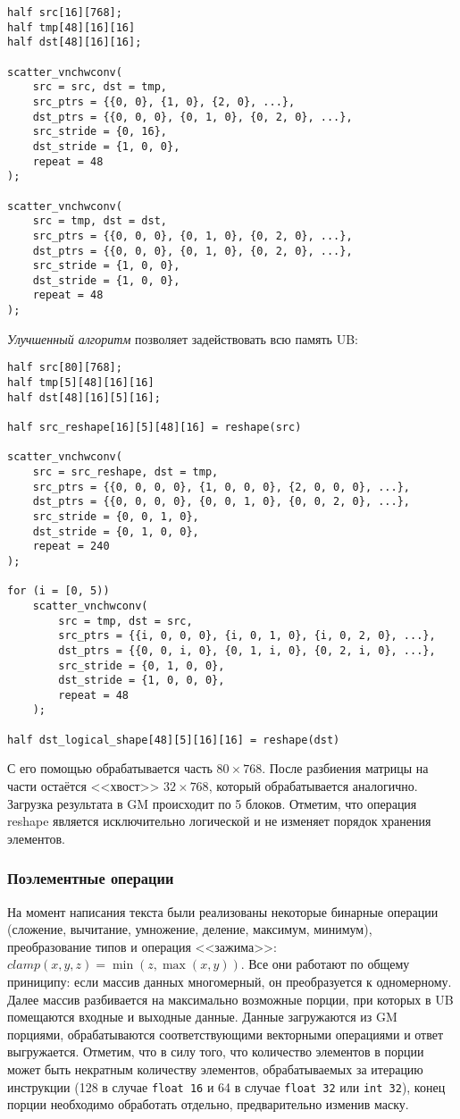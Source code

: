 \begin{lstlisting}
half src[16][768];
half tmp[48][16][16]
half dst[48][16][16];

scatter_vnchwconv(
    src = src, dst = tmp,
    src_ptrs = {{0, 0}, {1, 0}, {2, 0}, ...},
    dst_ptrs = {{0, 0, 0}, {0, 1, 0}, {0, 2, 0}, ...},
    src_stride = {0, 16},
    dst_stride = {1, 0, 0},
    repeat = 48
);

scatter_vnchwconv(
    src = tmp, dst = dst,
    src_ptrs = {{0, 0, 0}, {0, 1, 0}, {0, 2, 0}, ...},
    dst_ptrs = {{0, 0, 0}, {0, 1, 0}, {0, 2, 0}, ...},
    src_stride = {1, 0, 0},
    dst_stride = {1, 0, 0},
    repeat = 48
);
\end{lstlisting}

\textit{Улучшенный алгоритм} позволяет задействовать всю память UB:

\begin{lstlisting}
half src[80][768];
half tmp[5][48][16][16]
half dst[48][16][5][16];

half src_reshape[16][5][48][16] = reshape(src)

scatter_vnchwconv(
    src = src_reshape, dst = tmp,
    src_ptrs = {{0, 0, 0, 0}, {1, 0, 0, 0}, {2, 0, 0, 0}, ...},
    dst_ptrs = {{0, 0, 0, 0}, {0, 0, 1, 0}, {0, 0, 2, 0}, ...},
    src_stride = {0, 0, 1, 0},
    dst_stride = {0, 1, 0, 0},
    repeat = 240
);

for (i = [0, 5))
    scatter_vnchwconv(
        src = tmp, dst = src,
        src_ptrs = {{i, 0, 0, 0}, {i, 0, 1, 0}, {i, 0, 2, 0}, ...},
        dst_ptrs = {{0, 0, i, 0}, {0, 1, i, 0}, {0, 2, i, 0}, ...},
        src_stride = {0, 1, 0, 0},
        dst_stride = {1, 0, 0, 0},
        repeat = 48
    );

half dst_logical_shape[48][5][16][16] = reshape(dst)
\end{lstlisting}

С его помощью обрабатывается часть $80 \times 768$. После разбиения матрицы
на части остаётся <<хвост>> $32 \times 768$, который обрабатывается аналогично.
Загрузка результата в GM происходит по 5 блоков. Отметим, что операция reshape
является исключительно логической и не изменяет порядок хранения элементов.

\subsubsection{Поэлементные операции}

На момент написания текста были реализованы некоторые бинарные операции
(сложение, вычитание, умножение, деление, максимум, минимум), преобразование
типов и операция <<зажима>>: $clamp(x, y, z) = \min(z, \max(x, y))$. Все они
работают по общему приниципу: если массив данных многомерный, он преобразуется
к одномерному. Далее массив разбивается на максимально возможные порции,
при которых в UB помещаются входные и выходные данные. Данные загружаются из
GM порциями, обрабатываются соответствующими векторными операциями и ответ
выгружается. Отметим, что в силу того, что количество элементов в порции
может быть некратным количеству элементов, обрабатываемых за итерацию инструкции
(128 в случае \texttt{float 16} и 64 в случае \texttt{float 32} или
\texttt{int 32}), конец порции необходимо обработать отдельно, предварительно
изменив маску.

